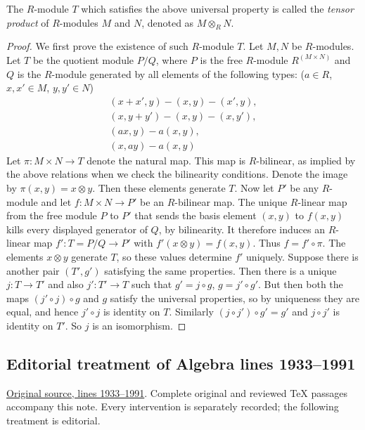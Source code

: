 \noindent
The $R$-module $T$ which satisfies the above universal property is called
the  {\it tensor product} of $R$-modules $M$ and $N$, denoted as
$M \otimes_R N$.

\begin{proof}
We first prove the existence of such $R$-module $T$.
Let $M, N$ be $R$-modules.
Let $T$ be the quotient module
$P/Q$, where $P$ is the free $R$-module $R^{(M \times N)}$ and $Q$ is the
$R$-module generated by all elements of
the following types: ($a\in R$, $x,x'\in M$, $y,y'\in N$)
\begin{align*}
(x + x', y) - (x, y) - (x', y), \\
(x, y + y') - (x, y) - (x, y'), \\
(ax, y) - a(x, y), \\
(x, ay) - a(x, y)
\end{align*}
Let $\pi : M \times N \to T$ denote the natural map.
This map is $R$-bilinear, as
implied by the above relations
when we check the bilinearity conditions. Denote the image by
$\pi(x, y) = x \otimes
y$. Then these elements generate
$T$. Now let $P'$ be any $R$-module and let
$f : M \times N \to P'$ be an $R$-bilinear map. The unique
$R$-linear map from the free module $P$ to $P'$ that sends the
basis element $(x,y)$ to $f(x,y)$ kills every displayed generator
of $Q$, by bilinearity. It therefore induces an $R$-linear map
$f' : T = P/Q \to P'$ with $f'(x\otimes y) = f(x,y)$.
Thus $f = f'\circ\pi$. The elements $x\otimes y$ generate $T$,
so these values determine $f'$ uniquely.
Suppose there is another pair $(T', g')$ satisfying the same properties.
Then there is a unique $j : T \to T'$ and
also $j' : T' \to T$ such that $g' = j\circ g$, $g = j'\circ g'$.
But then both the maps $(j'\circ j) \circ g$ and $g$
satisfy the universal properties, so by uniqueness they are equal,
and hence $j'\circ j$ is identity on $T$.
Similarly $(j\circ j') \circ g' = g'$ and $j\circ j'$ is identity on $T'$.
So $j$ is an isomorphism.
\end{proof}


\subsection{Editorial treatment of Algebra lines 1933--1991}

\hypertarget{algebra-context-006}{}

\noindent\href{https://github.com/stacks/stacks-project/blob/a04446e57ec1fbc252a871afcec7752fb2807b14/algebra.tex\#L1933}{Original source, lines 1933--1991}. Complete original and reviewed TeX passages accompany this note. Every intervention is separately recorded; the following treatment is editorial.


